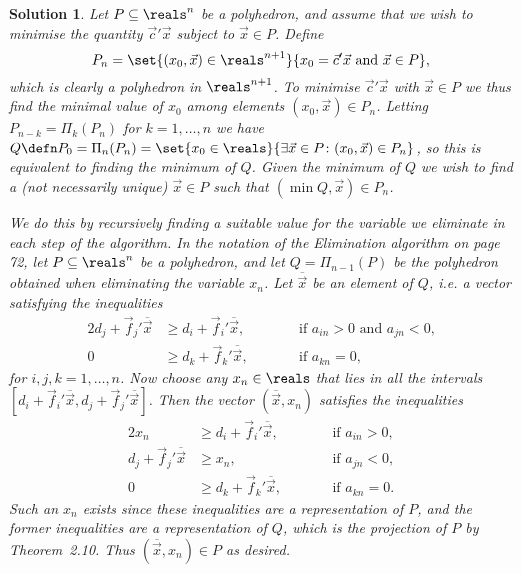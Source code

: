 \documentclass[article, a4paper, 11pt, oneside]{memoir}
\numberwithin{equation}{chapter}
\theoremstyle{nonumberplain}
\newtheorem{solution}{Solution}
\begin{document}
\begin{solution}
    Let $P \subseteq \reals^n$ be a polyhedron, and assume that we wish to minimise the quantity $\vec{c}'\vec{x}$ subject to $\vec{x} \in P$. Define
    \begin{equation*}
        P_n
            = \set{(x_0, \vec{x}) \in \reals^{n+1}}{x_0 = \vec{c}'\vec{x} \text{ and } \vec{x} \in P},
    \end{equation*}
    which is clearly a polyhedron in $\reals^{n+1}$. To minimise $\vec{c}'\vec{x}$ with $\vec{x} \in P$ we thus find the minimal value of $x_0$ among elements $(x_0, \vec{x}) \in P_n$. Letting $P_{n-k} = \Pi_k(P_n)$ for $k=1, \ldots, n$ we have $Q \defn P_0 = \Pi_n(P_n) = \set{x_0 \in \reals}{\exists \vec{x} \in P \colon (x_0,\vec{x}) \in P_n}$, so this is equivalent to finding the minimum of $Q$. Given the minimum of $Q$ we wish to find a (not necessarily unique) $\vec{x} \in P$ such that $(\min Q, \vec{x}) \in P_n$.

    We do this by recursively finding a suitable value for the variable we eliminate in each step of the algorithm. In the notation of the Elimination algorithm on page 72, let $P \subseteq \reals^n$ be a polyhedron, and let $Q = \Pi_{n-1}(P)$ be the polyhedron obtained when eliminating the variable $x_n$. Let $\overline{\vec{x}}$ be an element of $Q$, i.e. a vector satisfying the inequalities
    \begin{alignat*}{2}
        d_j + \vec{f}_j' \overline{\vec{x}}
            &\geq d_i + \vec{f}_i' \overline{\vec{x}}, \qquad
            && \text{if $a_{in} > 0$ and $a_{jn} < 0$,} \\
        0
            &\geq d_k + \vec{f}_k' \overline{\vec{x}}, \qquad
            && \text{if $a_{kn} = 0$,}
    \end{alignat*}
    for $i,j,k = 1, \ldots, n$. Now choose any $x_n \in \reals$ that lies in all the intervals $[d_i + \vec{f}_i' \overline{\vec{x}}, d_j + \vec{f}_j' \overline{\vec{x}}]$. Then the vector $(\overline{\vec{x}}, x_n)$ satisfies the inequalities
    \begin{alignat*}{2}
        x_n
            &\geq d_i + \vec{f}_i' \overline{\vec{x}}, \qquad
            && \text{if $a_{in} > 0$,} \\
        d_j + \vec{f}_j' \overline{\vec{x}}
            &\geq x_n, \qquad
            && \text{if $a_{jn} < 0$,} \\
        0
            &\geq d_k + \vec{f}_k' \overline{\vec{x}}, \qquad
            && \text{if $a_{kn} = 0$.}
    \end{alignat*}
    Such an $x_n$ exists since these inequalities are a representation of $P$, and the former inequalities are a representation of $Q$, which is the projection of $P$ by Theorem~2.10. Thus $(\overline{\vec{x}}, x_n) \in P$ as desired.
\end{solution}
\end{document}
